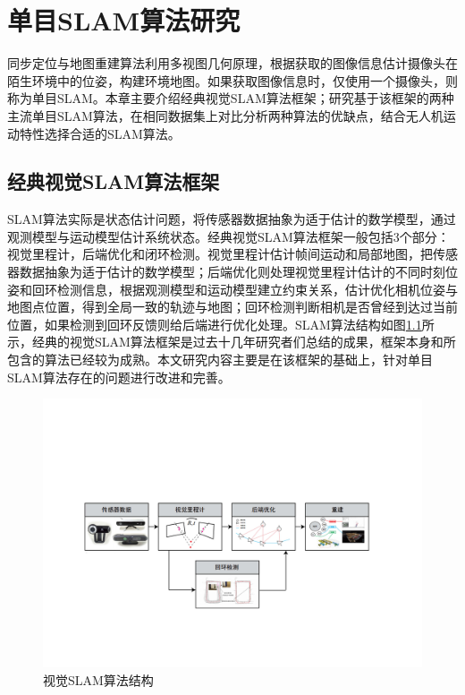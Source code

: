 
\chapter{单目SLAM算法研究}
\label{chap:ALGORITHM}

同步定位与地图重建算法利用多视图几何原理\upcite{[1]}，根据获取的图像信息估计摄像头在陌生环境中的位姿，构建环境地图。如果获取图像信息时，仅使用一个摄像头，则称为单目SLAM。本章主要介绍经典视觉SLAM算法框架；研究基于该框架的两种主流单目SLAM算法，在相同数据集上对比分析两种算法的优缺点，结合无人机运动特性选择合适的SLAM算法。

\section{经典视觉SLAM算法框架}
SLAM算法实际是状态估计问题，将传感器数据抽象为适于估计的数学模型，通过观测模型与运动模型估计系统状态。经典视觉SLAM算法框架\upcite{[3.1]}一般包括3个部分：视觉里程计，后端优化和闭环检测。视觉里程计估计帧间运动和局部地图，把传感器数据抽象为适于估计的数学模型；后端优化则处理视觉里程计估计的不同时刻位姿和回环检测信息，根据观测模型和运动模型建立约束关系，估计优化相机位姿与地图点位置，得到全局一致的轨迹与地图；回环检测判断相机是否曾经到达过当前位置，如果检测到回环反馈则给后端进行优化处理。SLAM算法结构如图\ref{fig3.1}所示，经典的视觉SLAM算法框架是过去十几年研究者们总结的成果，框架本身和所包含的算法已经较为成熟。本文研究内容主要是在该框架的基础上，针对单目SLAM算法存在的问题进行改进和完善。

\begin{figure}[h]
\centering
\includegraphics[scale=0.3,angle=-90]{figures/Fig3-1.pdf}
\caption{视觉SLAM算法结构}
\label{fig3.1}
\end{figure}

